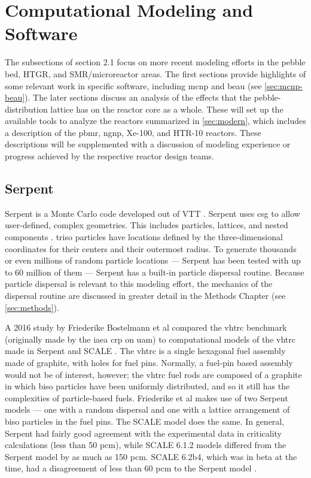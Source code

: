 
\section{Computational Modeling and Software}

The subsections of section 2.1 focus on more recent modeling efforts in the pebble bed, HTGR, and SMR/microreactor areas.  The first sections provide highlights of some relevant work in specific software, including \acrfull{mcnp} \cite{werner_mcnp_2017} and \acrfull{beau} \cite{cisneros_pebble_2013} (see \autoref{sec:mcnp-beau}).  The later sections discuss an analysis of the effects that the pebble-distribution lattice has on the reactor core as a whole.  These will set up the available tools to analyze the reactors summarized in \autoref{sec:modern}, which includes a description of the \acrfull{pbmr}, \acrfull{ngnp}, Xe-100, and HTR-10 reactors.  These descriptions will be supplemented with a discussion of modeling experience or progress achieved by the respective reactor design teams.

\subsection{Serpent}

Serpent is a Monte Carlo code developed out of VTT \cite{noauthor_serpent_nodate}. Serpent uses \acrfull{csg} to allow user-defined, complex geometries.  This includes particles, lattices, and nested components \cite{noauthor_serpent_nodate}.  \acrshort{triso} particles have locations defined by the three-dimensional coordinates for their centers and their outermost radius. To generate thousands or even millions of random particle locations --- Serpent has been tested with up to 60 million of them \cite{noauthor_serpent_nodate} --- Serpent has a built-in particle dispersal routine.  Because particle dispersal is relevant to this modeling effort, the mechanics of the dispersal routine are discussed in greater detail in the Methods Chapter (see \autoref{sec:methods}).

A 2016 study by Friederike Bostelmann et al compared the \acrfull{vhtrc} \cite{oecd_irphe_2019} benchmark (originally made by the \acrfull{iaea} \acrfull{crp} on \acrfull{uam}) to computational models of the \acrshort{vhtrc} made in Serpent and SCALE \cite{bostelmann_criticality_2016}.  The \acrshort{vhtrc} is a single hexagonal fuel assembly made of graphite, with holes for fuel pins.  Normally, a fuel-pin based assembly would not be of interest, however; the \acrshort{vhtrc} fuel rods are composed of a graphite in which \acrshort{biso} particles have been uniformly distributed, and so it still has the complexities of particle-based fuels.  Friederike et al makes use of two Serpent models --- one with a random dispersal and one with a lattice arrangement of \acrshort{biso} particles in the fuel pins.  The SCALE model does the same.  In general, Serpent had fairly good agreement with the experimental data in criticality calculations (less than 50 pcm), while SCALE 6.1.2 models differed from the Serpent model by as much as 150 pcm.  SCALE 6.2b4, which was in beta at the time, had a disagreement of less than 60 pcm to the Serpent model \cite{bostelmann_criticality_2016}.

